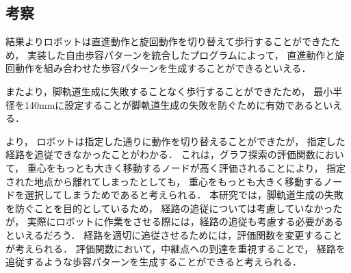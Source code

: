 \subsection{考察}
結果よりロボットは直進動作と旋回動作を切り替えて歩行することができたため，
実装した自由歩容パターンを統合したプログラムによって，
直進動作と旋回動作を組み合わせた歩容パターンを生成することができるといえる．

またより，脚軌道生成に失敗することなく歩行することができたため，
最小半径を140mmに設定することが脚軌道生成の失敗を防ぐために有効であるといえる．

より，
ロボットは指定した通りに動作を切り替えることができたが，
指定した経路を追従できなかったことがわかる．
これは，グラフ探索の評価関数において，
重心をもっとも大きく移動するノードが高く評価されることにより，
指定された地点から離れてしまったとしても，
重心をもっとも大きく移動するノードを選択してしまうためであると考えられる．
本研究では，脚軌道生成の失敗を防ぐことを目的としているため，
経路の追従については考慮していなかったが，
実際にロボットに作業をさせる際には，経路の追従も考慮する必要があるといえるだろう．
経路を適切に追従させるためには，評価関数を変更することが考えられる．
評価関数において，中継点への到達を重視することで，
経路を追従するような歩容パターンを生成することができると考えられる．
